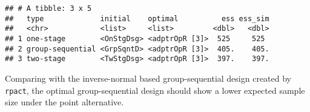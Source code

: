 \documentclass[
]{book}
\newenvironment{Shaded}{\begin{snugshade}}{\end{snugshade}}
\newcommand{\AttributeTok}[1]{\textcolor[rgb]{0.77,0.63,0.00}{#1}}
\newcommand{\CommentTok}[1]{\textcolor[rgb]{0.56,0.35,0.01}{\textit{#1}}}
\newcommand{\DecValTok}[1]{\textcolor[rgb]{0.00,0.00,0.81}{#1}}
\newcommand{\FunctionTok}[1]{\textcolor[rgb]{0.00,0.00,0.00}{#1}}
\newcommand{\NormalTok}[1]{#1}
\newcommand{\SpecialCharTok}[1]{\textcolor[rgb]{0.00,0.00,0.00}{#1}}
\begin{document}
\begin{Shaded}
\end{Shaded}

\begin{verbatim}
## # A tibble: 3 x 5
##   type             initial    optimal          ess ess_sim
##   <chr>            <list>     <list>         <dbl>   <dbl>
## 1 one-stage        <OnStgDsg> <adptrOpR [3]>  525     525 
## 2 group-sequential <GrpSqntD> <adptrOpR [3]>  405.    405.
## 3 two-stage        <TwStgDsg> <adptrOpR [3]>  397.    397.
\end{verbatim}

Comparing with the inverse-normal based group-sequential design created
by \texttt{rpact}, the optimal group-sequential design should show
a lower expected sample size under the point alternative.
\end{document}

